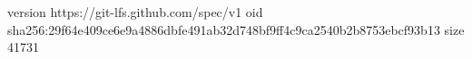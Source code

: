 version https://git-lfs.github.com/spec/v1
oid sha256:29f64e409ce6e9a4886dbfe491ab32d748bf9ff4c9ca2540b2b8753ebcf93b13
size 41731
